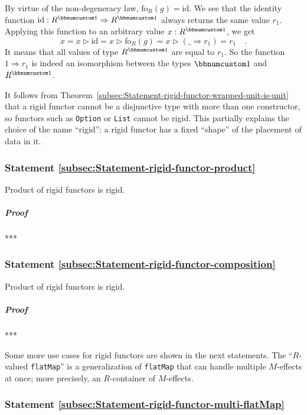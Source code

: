By virtue of the non-degeneracy law, $\text{fo}_{R}(g)=\text{id}$.
We see that the identity function $\text{id}:R^{\bbnum 1}\Rightarrow R^{\bbnum 1}$
always returns the same value $r_{1}$. Applying this function to
an arbitrary value $x:R^{\bbnum 1}$, we get
\[
x=x\triangleright\text{id}=x\triangleright\text{fo}_{R}(g)=x\triangleright(\_\Rightarrow r_{1})=r_{1}\quad.
\]
It means that all values of type $R^{\bbnum 1}$ are equal to $r_{1}$.
So the function $1\Rightarrow r_{1}$ is indeed an isomorphism between
the types $\bbnum 1$ and $R^{\bbnum 1}$.

It follows from Theorem~\ref{subsec:Statement-rigid-functor-wrapped-unit-is-unit}
that a rigid functor cannot be a disjunctive type with more than one
constructor, so functors such as \lstinline!Option!
or \lstinline!List! cannot
be rigid. This partially explains the choice of the name ``rigid'':
a rigid functor has a fixed ``shape'' of the placement of data in
it.

\subsubsection{Statement \label{subsec:Statement-rigid-functor-product}\ref{subsec:Statement-rigid-functor-product}}

Product of rigid functors is rigid.

\subparagraph{Proof}

{*}{*}{*}

\subsubsection{Statement \label{subsec:Statement-rigid-functor-composition}\ref{subsec:Statement-rigid-functor-composition}}

Product of rigid functors is rigid.

\subparagraph{Proof}

{*}{*}{*}

Some more use cases for rigid functors are shown in the next statements.
The ``$R$-valued \lstinline!flatMap!''
is a generalization of \lstinline!flatMap!
that can handle multiple $M$-effects at once; more precisely, an
$R$-container of $M$-effects.

\subsubsection{Statement \label{subsec:Statement-rigid-functor-multi-flatMap}\ref{subsec:Statement-rigid-functor-multi-flatMap}}


